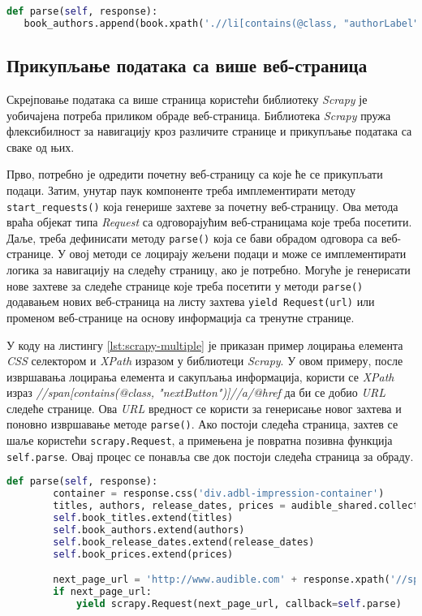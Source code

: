 \documentclass[12pt,oneside]{memoir}
\begin{document}
\begin{lstlisting}[language=Python, caption={Лоцирање елемента \textit{XPath} изразом и \textit{CSS} селектором}, label={lst:scrapy-css-xpath}]
def parse(self, response):
   book_authors.append(book.xpath('.//li[contains(@class, "authorLabel")]').css('a::text').get().strip())
\end{lstlisting}

\subsection{Прикупљање података са више веб-страница}
Скрејповање података са више страница користећи библиотеку \textit{Scrapy} је уобичајена потреба приликом обраде веб-страница. Библиотека \textit{Scrapy} пружа флексибилност за навигацију кроз различите странице и прикупљање података са сваке од њих. 

Прво, потребно је одредити почетну веб-страницу са које ће се прикупљати подаци. Затим, унутар паук компоненте треба имплементирати методу \texttt{start\_requests()} која генерише захтеве за почетну веб-страницу. Ова метода враћа објекат типа \textit{Request} са одговорајућим веб-страницама које треба посетити. Даље, треба дефинисати методу \texttt{parse()} која се бави обрадом одговора са веб-странице. У овој методи се лоцирају жељени подаци и може се имплементирати логика за навигацију на следећу страницу, ако је потребно. Могуће је генерисати нове захтеве за следеће странице које треба посетити у методи \texttt{parse()} додавањем нових веб-страница на листу захтева \texttt{yield Request(url)} или променом веб-странице на основу информација са тренутне странице.

У коду на листингу \ref{lst:scrapy-multiple} је приказан пример лоцирања елемента \textit{CSS} селектором и \textit{XPath} изразом у библиотеци \textit{Scrapy}. У овом примеру, после извршавања лоцирања елемента и сакупљања информација, користи се  \textit{XPath} израз \textit{//span[contains(@class, "nextButton")]//a/@href}  да би се добио \textit{URL} следеће странице. Ова \textit{URL} вредност се користи за генерисање новог захтева и поновно извршавање методе \texttt{parse()}. Ако постоји следећа страница, захтев се шаље користећи \texttt{scrapy.Request}, а примењена је повратна позивна функција \texttt{self.parse}. Овај процес се понавља све док постоји следећа страница за обраду.

\begin{lstlisting}[language=Python, caption={Прикупљање података са више страница}, label={lst:scrapy-multiple}]
    def parse(self, response):
        container = response.css('div.adbl-impression-container')
        titles, authors, release_dates, prices = audible_shared.collect_books_info(container)
        self.book_titles.extend(titles)
        self.book_authors.extend(authors)
        self.book_release_dates.extend(release_dates)
        self.book_prices.extend(prices)

        next_page_url = 'http://www.audible.com' + response.xpath('//span[contains(@class, "nextButton")]//a/@href').get()
        if next_page_url:
            yield scrapy.Request(next_page_url, callback=self.parse)     
\end{lstlisting}
\end{document}
